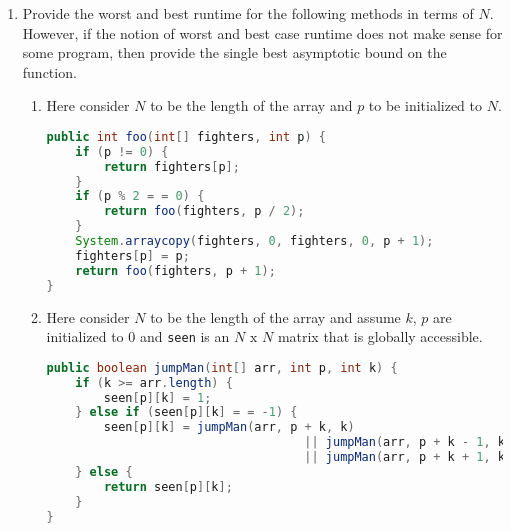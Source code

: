 \documentclass{article}
\newenvironment{Questions}[1][Question]
{\begin{enumerate}}
	{\end{enumerate}}
\newcommand{\Question}{\item }
\begin{document}
\begin{Questions}
        \Question
		Provide the worst and best runtime for the following methods in terms of $N$. However, if the notion of worst and best case runtime does not make sense for some program, then provide the single best asymptotic bound on the function.
			\begin{enumerate}
				\item
				Here consider $N$ to be the length of the array and $p$ to be initialized to $N$.
				\begin{lstlisting}[language=Java]
public int foo(int[] fighters, int p) {
	if (p != 0) {
		return fighters[p];
	}
	if (p % 2 = = 0) {
		return foo(fighters, p / 2);
	}
	System.arraycopy(fighters, 0, fighters, 0, p + 1);
	fighters[p] = p;
	return foo(fighters, p + 1);
}
			    \end{lstlisting}
				\item
				Here consider $N$ to be the length of the array and assume $k$, $p$ are initialized to 0 and \texttt{seen} is an $N \text{ x } N$ matrix that is globally accessible.
				\begin{lstlisting}[language=Java]
public boolean jumpMan(int[] arr, int p, int k) {
	if (k >= arr.length) {
		seen[p][k] = 1;
	} else if (seen[p][k] = = -1) {
		seen[p][k] = jumpMan(arr, p + k, k)
									|| jumpMan(arr, p + k - 1, k - 1)
									|| jumpMan(arr, p + k + 1, k + 1);
	} else {
		return seen[p][k];
	}
}
				\end{lstlisting}
			\end{enumerate}

	\end{Questions}
\end{document}
